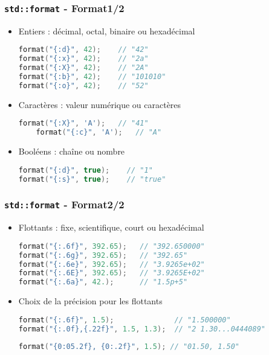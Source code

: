 \documentclass[C++.tex]{subfiles}
\begin{document}
\begin{frame}[fragile]
	\frametitle{\lstinline|std::format| - Format\titlehfill{}1/2}
	\begin{itemize}
		\item Entiers : décimal, octal, binaire ou hexadécimal

		\begin{lstlisting}[language=C++]
format("{:d}", 42);    // "42"
format("{:x}", 42);    // "2a"
format("{:X}", 42);    // "2A"
format("{:b}", 42);    // "101010"
format("{:o}", 42);    // "52"\end{lstlisting}

		\item Caractères : valeur numérique ou caractères

\begin{lstlisting}[language=C++]
	format("{:X}", 'A');   // "41"
	format("{:c}", 'A');   // "A"\end{lstlisting}

		\item Booléens : chaîne ou nombre

		\begin{lstlisting}[language=C++]
format("{:d}", true);    // "1"
format("{:s}", true);    // "true"\end{lstlisting}
	\end{itemize}
\end{frame}

\begin{frame}[fragile]
	\frametitle{\lstinline|std::format| - Format\titlehfill{}2/2}
	\begin{itemize}
		\item Flottants : fixe, scientifique, \og court\fg{} ou hexadécimal

		\begin{lstlisting}[language=C++]
format("{:.6f}", 392.65);   // "392.650000"
format("{:.6g}", 392.65);   // "392.65"
format("{:.6e}", 392.65);   // "3.9265e+02"
format("{:.6E}", 392.65);   // "3.9265E+02"
format("{:.6a}", 42.);    	// "1.5p+5"\end{lstlisting}


		\item Choix de la précision pour les flottants

		\begin{lstlisting}[language=C++]
format("{:.6f}", 1.5);				// "1.500000"
format("{:.0f},{.22f}", 1.5, 1.3);	// "2 1.30...0444089"\end{lstlisting}

		\begin{lstlisting}[language=C++]
format("{0:05.2f}, {0:.2f}", 1.5); // "01.50, 1.50"\end{lstlisting}
	\end{itemize}
\end{frame}
\end{document}

